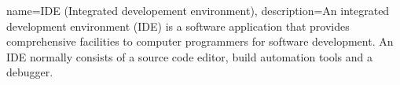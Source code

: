 {
    name=IDE (Integrated developement environment),
    description={An integrated development environment (IDE) is a software application that provides comprehensive facilities to computer programmers for software development. An IDE normally consists of a source code editor, build automation tools and a debugger.}
} 
